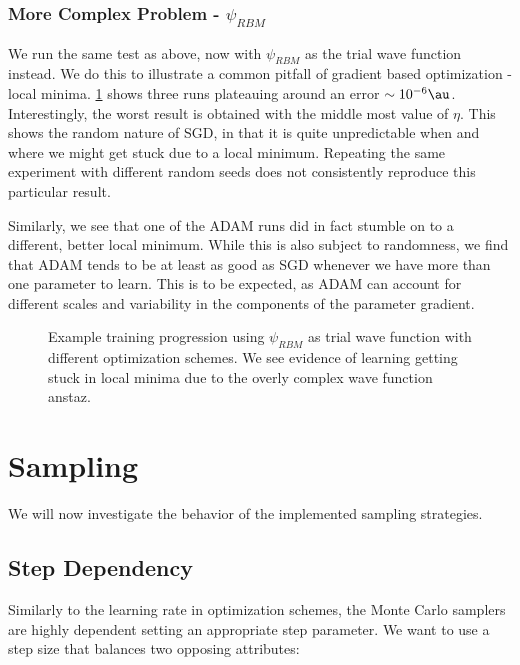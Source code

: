 \documentclass[Thesis.tex]{subfiles}
\begin{document}
\subsubsection{More Complex Problem - $\psi_{RBM}$}

We run the same test as above, now with $\psi_{RBM}$ as the trial wave function
instead. We do this to illustrate a common pitfall of gradient based
optimization - local minima. \cref{fig:verify-lr-rbm} shows three runs
plateauing around an error $\sim 10^{-6}\si{\au}$. Interestingly, the worst
result is obtained with the middle most value of $\eta$. This shows the random
nature of SGD, in that it is quite unpredictable when and where we might get
stuck due to a local minimum. Repeating the same experiment with different random
seeds does not consistently reproduce this particular result.

Similarly, we see that one of the ADAM runs did in fact stumble on to a
different, better local minimum. While this is also subject to randomness, we
find that ADAM tends to be at least as good as SGD whenever we have more than
one parameter to learn. This is to be expected, as ADAM can account for
different scales and variability in the components of the parameter gradient.

\begin{figure}[h]
  \centering
    \resizebox{\linewidth}{!}{%
      
    }
  \caption[Comparison of optimization schemes on a complicated problem]{\label{fig:verify-lr-rbm}Example training progression using
    $\psi_{RBM}$ as trial wave function with different optimization schemes. We
    see evidence of learning getting stuck in local minima due to the overly
    complex wave function anstaz.}
\end{figure}


\section{Sampling}
\label{sec:verify-sampling}

We will now investigate the behavior of the implemented sampling strategies.

\subsection{Step Dependency}

Similarly to the learning rate in optimization schemes, the Monte Carlo samplers
are highly dependent setting an appropriate step parameter. We want to use a
step size that balances two opposing attributes:
\end{document}
